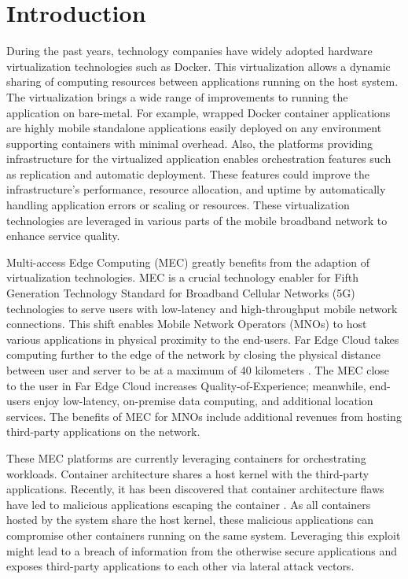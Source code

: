 \chapter{Introduction}
\label{chapter:intro}

During the past years, technology companies have widely adopted hardware virtualization technologies such as Docker. This virtualization allows a dynamic sharing of computing resources between applications running on the host system. The virtualization brings a wide range of improvements to running the application on bare-metal. For example, wrapped Docker container applications are highly mobile standalone applications easily deployed on any environment supporting containers with minimal overhead. Also, the platforms providing infrastructure for the virtualized application enables orchestration features such as replication and automatic deployment. These features could improve the infrastructure's performance, resource allocation, and uptime by automatically handling application errors or scaling or resources. These virtualization technologies are leveraged in various parts of the mobile broadband network to enhance service quality.

Multi-access Edge Computing (MEC) greatly benefits from the adaption of virtualization technologies. MEC is a crucial technology enabler for Fifth Generation Technology Standard for Broadband Cellular Networks (5G) technologies to serve users with low-latency and high-throughput mobile network connections. This shift enables Mobile Network Operators (MNOs) to host various applications in physical proximity to the end-users. Far Edge Cloud takes computing further to the edge of the network by closing the physical distance between user and server to be at a maximum of 40 kilometers \cite{AirFrameOpenEdgeServer}. The MEC close to the user in Far Edge Cloud increases Quality-of-Experience; meanwhile, end-users enjoy low-latency, on-premise data computing, and additional location services. The benefits of MEC for MNOs include additional revenues from hosting third-party applications on the network.

These MEC platforms are currently leveraging containers for orchestrating workloads. Container architecture shares a host kernel with the third-party applications. Recently, it has been discovered that container architecture flaws have led to malicious applications escaping the container \cite{CVE-2020-14386}\cite{CVE-2019-5736}. As all containers hosted by the system share the host kernel, these malicious applications can compromise other containers running on the same system. Leveraging this exploit might lead to a breach of information from the otherwise secure applications and exposes third-party applications to each other via lateral attack vectors.

